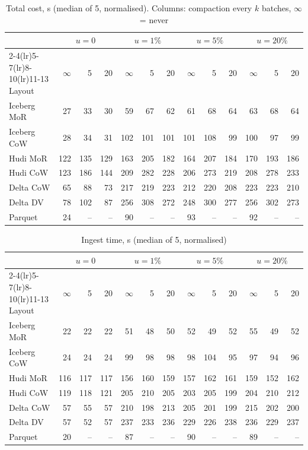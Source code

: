 \begin{table}[!t]\centering
\caption{Total cost, s (median of 5, normalised). Columns: compaction every $k$ batches, $\infty$ = never}\label{tab:a-total}
\footnotesize
\begin{tabular}{@{}lrrrrrrrrrrrr@{}}\toprule
 & \multicolumn{3}{c}{$u=0$} & \multicolumn{3}{c}{$u=1\%$} & \multicolumn{3}{c}{$u=5\%$} & \multicolumn{3}{c}{$u=20\%$}\\
\cmidrule(lr){2-4}\cmidrule(lr){5-7}\cmidrule(lr){8-10}\cmidrule(lr){11-13}
Layout & $\infty$ & 5 & 20 & $\infty$ & 5 & 20 & $\infty$ & 5 & 20 & $\infty$ & 5 & 20\\\midrule
Iceberg MoR & 27 & 33 & 30 & 59 & 67 & 62 & 61 & 68 & 64 & 63 & 68 & 64\\
Iceberg CoW & 28 & 34 & 31 & 102 & 101 & 101 & 101 & 108 & 99 & 100 & 97 & 99\\
Hudi MoR & 122 & 135 & 129 & 163 & 205 & 182 & 164 & 207 & 184 & 170 & 193 & 186\\
Hudi CoW & 123 & 186 & 144 & 209 & 282 & 228 & 206 & 273 & 219 & 208 & 278 & 233\\
Delta CoW & 65 & 88 & 73 & 217 & 219 & 223 & 212 & 220 & 208 & 223 & 223 & 210\\
Delta DV & 78 & 102 & 87 & 256 & 308 & 272 & 248 & 300 & 277 & 256 & 302 & 273\\
Parquet & 24 & -- & -- & 90 & -- & -- & 93 & -- & -- & 92 & -- & --\\\bottomrule
\end{tabular}
\end{table}

\begin{table}[!t]\centering
\caption{Ingest time, s (median of 5, normalised)}\label{tab:a-write}
\footnotesize
\begin{tabular}{@{}lrrrrrrrrrrrr@{}}\toprule
 & \multicolumn{3}{c}{$u=0$} & \multicolumn{3}{c}{$u=1\%$} & \multicolumn{3}{c}{$u=5\%$} & \multicolumn{3}{c}{$u=20\%$}\\
\cmidrule(lr){2-4}\cmidrule(lr){5-7}\cmidrule(lr){8-10}\cmidrule(lr){11-13}
Layout & $\infty$ & 5 & 20 & $\infty$ & 5 & 20 & $\infty$ & 5 & 20 & $\infty$ & 5 & 20\\\midrule
Iceberg MoR & 22 & 22 & 22 & 51 & 48 & 50 & 52 & 49 & 52 & 55 & 49 & 52\\
Iceberg CoW & 24 & 24 & 24 & 99 & 98 & 98 & 98 & 104 & 95 & 97 & 94 & 96\\
Hudi MoR & 116 & 117 & 117 & 156 & 160 & 159 & 157 & 162 & 161 & 159 & 152 & 162\\
Hudi CoW & 119 & 118 & 121 & 205 & 210 & 205 & 203 & 205 & 199 & 204 & 210 & 212\\
Delta CoW & 57 & 55 & 57 & 210 & 198 & 213 & 205 & 201 & 199 & 215 & 202 & 200\\
Delta DV & 57 & 52 & 57 & 237 & 233 & 236 & 229 & 226 & 238 & 236 & 229 & 237\\
Parquet & 20 & -- & -- & 87 & -- & -- & 90 & -- & -- & 89 & -- & --\\\bottomrule
\end{tabular}
\end{table}

